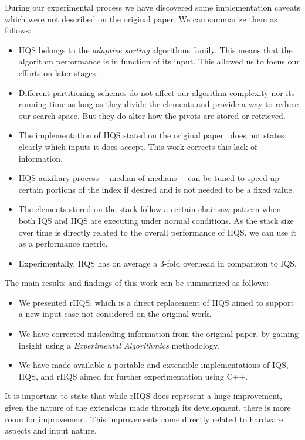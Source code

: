 During our experimental process we have discovered some implementation caveats which were not described on the original paper. We can summarize them as follows:
\begin{itemize}
    \item IIQS belongs to the \emph{adaptive sorting} algorithms family. This means that the algorithm performance is in function of its input. This allowed us to focus our efforts on later stages.
    \item Different partitioning schemes do not affect our algorithm complexity nor its running time as long as they divide the elements and provide a way to reduce our search space. But they do alter how the pivots are stored or retrieved.
    \item The implementation of IIQS stated on the original paper~\cite{7416566} does not states clearly which inputs it does accept. This work corrects this lack of information.
    \item IIQS auxiliary process ---median-of-medians--- can be tuned to speed up certain portions of the index if desired and is not needed to be a fixed value.
    \item The elements stored on the stack follow a certain chainsaw pattern when both IQS and IIQS are executing under normal conditions. As the stack size over time is directly related to the overall performance of IIQS, we can use it as a performance metric.
    \item Experimentally, IIQS has on average a 3-fold overhead in comparison to IQS.
\end{itemize}

The main results and findings of this work can be summarized as follows:
\begin{itemize}
    \item We presented rIIQS, which is a direct replacement of IIQS aimed to support a new input case not considered on the original work.
    \item We have corrected misleading information from the original paper, by gaining insight using a \emph{Experimental Algorithmics} methodology.
    \item We have made available a portable and extensible implementations of IQS, IIQS, and rIIQS aimed for further experimentation using C++.
\end{itemize}

It is important to state that while rIIQS does represent a huge improvement, given the nature of the extensions made through its development, there is more room for improvement. This improvements come directly related to hardware aspects and input nature.

